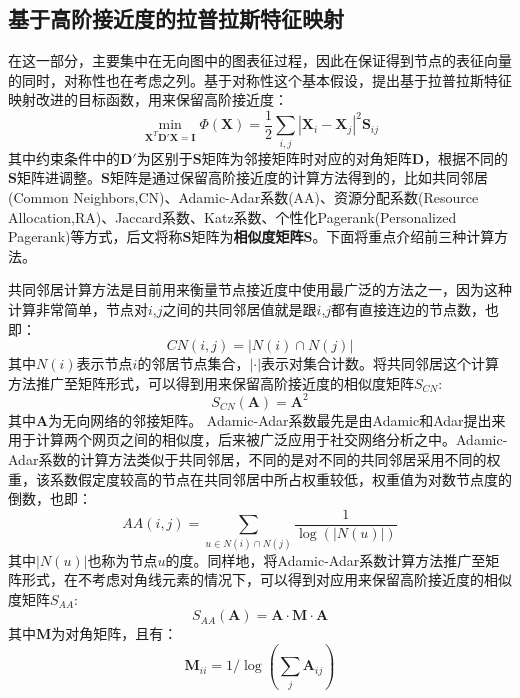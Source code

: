 \subsection{基于高阶接近度的拉普拉斯特征映射}
在这一部分，主要集中在无向图中的图表征过程，因此在保证得到节点的表征向量的同时，对称性也在考虑之列。基于对称性这个基本假设，提出基于拉普拉斯特征映射改进的目标函数，用来保留高阶接近度：
\begin{equation}\label{high_order_condition}
	\min_{\textbf{X}^T\textbf{D}'\textbf{X}=\textbf{I}} \Phi(\textbf{X}) = \frac{1}{2}\sum_{i,j}|\textbf{X}_i - \textbf{X}_j|^2\textbf{S}_{ij} 
\end{equation}
其中约束条件中的$\textbf{D}'$为区别于$\textbf{S}$矩阵为邻接矩阵时对应的对角矩阵$\textbf{D}$，根据不同的$\textbf{S}$矩阵进调整。$\textbf{S}$矩阵是通过保留高阶接近度的计算方法得到的，比如共同邻居(Common Neighbors,CN)\cite{newman2001clustering}、Adamic-Adar系数(AA)\cite{adamic2003friends}、资源分配系数(Resource Allocation,RA)\cite{zhou2009predicting}、Jaccard系数、Katz系数、个性化Pagerank(Personalized Pagerank)\cite{wang2015link}等方式，后文将称$\textbf{S}$矩阵为\textbf{相似度矩阵$\textbf{S} $}。下面将重点介绍前三种计算方法。

共同邻居计算方法是目前用来衡量节点接近度中使用最广泛的方法之一，因为这种计算非常简单，节点对$i$,$j$之间的共同邻居值就是跟$i$,$j$都有直接连边的节点数，也即：
\begin{equation}
	CN(i,j) = |N(i) \cap N(j)|
\end{equation}
其中$N(i)$表示节点$i$的邻居节点集合，$|\cdot|$表示对集合计数。将共同邻居这个计算方法推广至矩阵形式，可以得到用来保留高阶接近度的相似度矩阵$S_{CN}$:
\begin{equation}
	S_{CN}(\textbf{A}) = \textbf{A}^2
\end{equation}
其中$\textbf{A}$为无向网络的邻接矩阵。
Adamic-Adar系数最先是由Adamic和Adar提出来用于计算两个网页之间的相似度，后来被广泛应用于社交网络分析之中。Adamic-Adar系数的计算方法类似于共同邻居，不同的是对不同的共同邻居采用不同的权重，该系数假定度较高的节点在共同邻居中所占权重较低，权重值为对数节点度的倒数，也即：
\begin{equation}
	AA(i,j) = \sum_{u \in N(i)\cap N(j)} \frac{1}{\log(|N(u)|)}
\end{equation}
其中$|N(u)|$也称为节点$u$的度。同样地，将Adamic-Adar系数计算方法推广至矩阵形式，在不考虑对角线元素的情况下，可以得到对应用来保留高阶接近度的相似度矩阵$S_{AA}$:
\begin{equation}
	S_{AA}(\textbf{A}) = \textbf{A} \cdot \textbf{M} \cdot \textbf{A}
\end{equation}
其中$\textbf{M}$为对角矩阵，且有：
\begin{equation}
\textbf{M}_{ii} = 1/\log(\sum_j{\textbf{A}_{ij}})
\end{equation}

